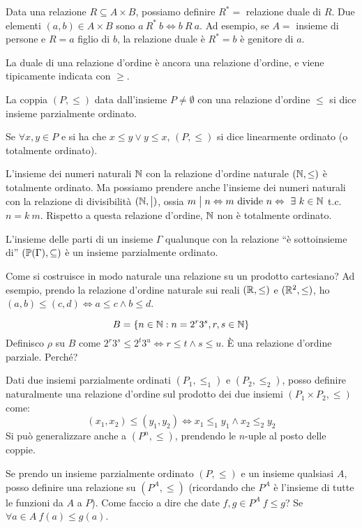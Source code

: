Data una relazione $R \subseteq A \times B$, possiamo definire $R^{\ast} = $ relazione duale di $R$. Due elementi $(a,b) \in A \times B$ sono $a \ R^{\ast} \ b \iff b \ R \ a$. Ad esempio, se $A = $ insieme di persone e $R = a $ figlio di $b$, la relazione duale \`e $R^{\ast} = b $ \`e genitore di $a$.

La duale di una relazione d'ordine \`e ancora una relazione d'ordine, e viene tipicamente indicata con $\geq$.

La coppia $(P, \leq)$ data dall'insieme $P \neq \emptyset$ con una relazione d'ordine $\le$ si dice insieme parzialmente ordinato.

Se $\forall x, y \in P$ e si ha che $x \leq y \lor y \leq x$, $(P, \leq)$ si dice linearmente ordinato (o totalmente ordinato).

L'insieme dei numeri naturali $\mathbb{N}$ con la relazione d'ordine naturale $(\mathbb{N}, \leq)$ \`e totalmente ordinato. Ma possiamo prendere anche l'insieme dei numeri naturali con la relazione di divisibilit\`a $(\mathbb{N}, \bigm|)$, ossia $m \divides n \iff m \text{ divide } n \iff \exists k \in \naturals$ t.c. $n = k \ m$. Rispetto a questa relazione d'ordine, $\mathbb{N}$ non \`e totalmente ordinato.

L'insieme delle parti di un insieme $\Gamma$ qualunque con la relazione ``\`e sottoinsieme di'' $\left(\mathbb{P}(\Gamma), \subseteq \right)$ \`e un insieme parzialmente ordinato. 

Come si costruisce in modo naturale una relazione su un prodotto cartesiano? Ad esempio, prendo la relazione d'ordine naturale sui reali $(\mathbb{R}, \leq)$ e $(\mathbb{R}^2, \leq)$, ho $(a,b) \leq (c,d) \iff a \leq c \land b \leq d$.

\[
B = \{ n \in \mathbb{N} : n = 2^r 3^s, r, s \in \mathbb{N}\}
\]
Definisco $\rho$ su $B$ come $2^r 3^s \leq 2^t 3^u \iff r \leq t \land s \leq u$. \`E una relazione d'ordine parziale. Perch\'e?
\vspace{3cm}

\begin{defn}
Dati due insiemi parzialmente ordinati $(P_1, \le_1)$ e $(P_2, \le_2)$, posso definire naturalmente una relazione d'ordine sul prodotto dei due insiemi $(P_1 \times P_2, \le)$ come:
\[
(x_1, x_2) \le (y_1, y_2) \iff x_1 \le_1 y_1 \land x_2 \le_2 y_2
\]
Si pu\`o generalizzare anche a $(P^n, \le)$, prendendo le $n$-uple al posto delle coppie.
\end{defn}

\begin{defn}\label{ordine_funzioni}
Se prendo un insieme parzialmente ordinato $(P, \le)$ e un insieme qualsiasi $A$, posso definire una relazione su $(P^A, \le)$ (ricordando che $P^A$ \`e l'insieme di tutte le funzioni da $A$ a $P$). Come faccio a dire che date $f, g \in P^A \ f \le g$? Se $\forall a \in A \ f(a) \le g(a)$.
\end{defn}

